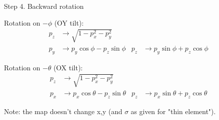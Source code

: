 \documentclass[english]{article}
\begin{document}
 Step 4. Backward rotation
 
 Rotation on $-\phi$ (OY tilt):
 \begin{align}
 p_z & \to \sqrt{1-p_x^2-p_y^2} \\
 p_y & \to   p_y \cos \phi - p_z \sin\phi &
 p_z & \to   p_y \sin \phi + p_z \cos\phi 
 \end{align}
 
 Rotation on $-\theta$ (OX tilt):
 \begin{align}
 p_z & \to \sqrt{1-p_x^2-p_y^2} \\
 p_x & \to   p_x \cos \theta - p_z \sin\theta &
 p_z & \to   p_x \sin \theta + p_z \cos\theta 
 \end{align}
 
Note: the map doesn't change x,y (and $\sigma$ as given for "thin element"). 




\end{document}

